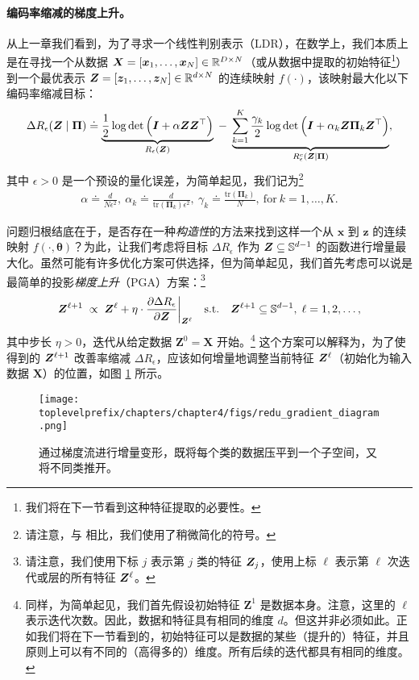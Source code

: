 \documentclass[../../book-main.tex]{subfiles}
\begin{document}
\paragraph{编码率缩减的梯度上升。} 从上一章我们看到，为了寻求一个线性判别表示（LDR），在数学上，我们本质上是在寻找一个从数据 $\bm{X} = [\bm{x}_1, \ldots, \bm{x}_N] \in \mathbb{R}^{D \times N}$（或从数据中提取的初始特征\footnote{我们将在下一节看到这种特征提取的必要性。}）到一个最优表示 $\bm{Z} = [\bm{z}_1, \ldots, \bm{z}_N] \in \mathbb{R}^{d \times N}$ 的连续映射 $f(\cdot)$，该映射最大化以下编码率缩减目标：
\begin{equation}\label{eq:mcr-formulation}
\begin{split}
\Delta R_{\epsilon}(\bm{Z} \mid \bm{\Pi}) \doteq \underbrace{\frac{1}{2}\log\det \Big(\bm{I} + {\alpha} \bm{Z} \bm{Z}^{\top} \Big)}_{R_{\epsilon}(\bm{Z})} \;-\; \underbrace{\sum_{k=1}^{K}\frac{\gamma_{k}}{2} \log\det\Big(\bm{I} + {\alpha_{k}} \bm{Z} \bm{\Pi}_{k} \bm{Z}^{\top} \Big)}_{R_{\epsilon}^c(\bm{Z} \mid \bm \Pi)},
\end{split}
\end{equation}
其中 $\epsilon > 0$ 是一个预设的量化误差，为简单起见，我们记为\footnote{请注意，与  相比，我们使用了稍微简化的符号。}
\begin{align*}
    \alpha \doteq \frac{d}{N\epsilon^2},\ \alpha_{k} \doteq \frac{d}{\mathrm{tr}(\bm{\Pi}_{k})\epsilon^2},\ \gamma_{k} \doteq \frac{\mathrm{tr}(\bm{\Pi}_{k})}{N},\ \text{for}\ k = 1,\ldots, K.
\end{align*}

问题归根结底在于，是否存在一种{\em 构造性}的方法来找到这样一个从 $\bm x$ 到 $\bm z$ 的连续映射 $f(\cdot,\bm \theta)$？为此，让我们考虑将目标 $\Delta R_{\epsilon}$ 作为 $\bm{Z} \subseteq \mathbb{S}^{d-1}$ 的函数进行增量最大化。虽然可能有许多优化方案可供选择，但为简单起见，我们首先考虑可以说是最简单的投影{\em 梯度上升}（PGA）方案：\footnote{请注意，我们使用下标 $j$ 表示第 $j$ 类的特征 $\bm{Z}_j$，使用上标 $\ell$ 表示第 $\ell$ 次迭代或层的所有特征 $\bm{Z}^{\ell}$。}
\begin{equation}
\bm Z^{\ell+1}   \; \propto \; \bm Z^{\ell} + \eta \cdot \frac{\partial \Delta R_{\epsilon}}{\partial \bm Z}\bigg|_{\bm{Z}^{\ell}}
\quad \mbox{s.t.} \quad \bm{Z}^{\ell+1} \subseteq \mathbb{S}^{d-1}, \; \ell = 1, 2, \ldots,
\label{eqn:gradient-descent}
\end{equation}
其中步长 $\eta >0$，迭代从给定数据 $\bm Z^{0} = \bm X$ 开始。\footnote{同样，为简单起见，我们首先假设初始特征 $\bm Z^{1}$ 是数据本身。注意，这里的 $\ell$ 表示迭代次数。因此，数据和特征具有相同的维度 $d$。但这并非必须如此。正如我们将在下一节看到的，初始特征可以是数据的某些（提升的）特征，并且原则上可以有不同的（高得多的）维度。所有后续的迭代都具有相同的维度。}
这个方案可以解释为，为了使得到的 $\bm{Z}^{\ell +1}$ 改善率缩减 $\Delta R_{\epsilon}$，应该如何增量地调整当前特征 $\bm{Z}^\ell$（初始化为输入数据 $\bm X$）的位置，如图 \ref{fig:gradient-flow} 所示。
\begin{figure}
\centering
    \texttt{[image: \\toplevelprefix/chapters/chapter4/figs/redu\_gradient\_diagram.png]}
    \caption{通过梯度流进行增量变形，既将每个类的数据压平到一个子空间，又将不同类推开。}
    \label{fig:gradient-flow}
\end{figure}
\end{document}
